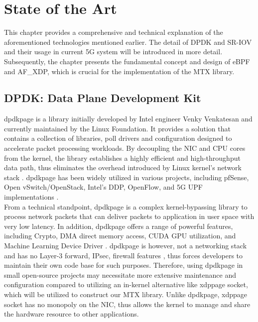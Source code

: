 \cleardoublepage\chapter{State of the Art}\label{sec:sota}\minitoc\vspace{.5cm}
This chapter provides a comprehensive and technical explanation of the aforementioned technologies mentioned earlier. 
The detail of DPDK and SR-IOV and their usage in current 5G system will be introduced in more detail.
Subsequently, the chapter presents the fundamental concept and design of eBPF and AF\_XDP, which is crucial for the implementation of the MTX library.

\section{DPDK: Data Plane Development Kit}
\ac{dpdkpage} is a library initially developed by Intel engineer Venky Venkatesan and currently maintained by the Linux Foundation. 
It provides a solution that contains a collection of libraries, poll drivers and configuration designed to accelerate packet processing workloads. 
By decoupling the NIC and CPU cores from the kernel, the library establishes a highly efficient and high-throughput data path, thus eliminates the overhead introduced by Linux kernel's network stack \cite{kourtis_enhancing_2015}. 
\ac{dpdkpage} has been widely utilized in various projects, including pfSense, Open vSwitch/OpenStack, Intel's DDP, OpenFlow, and 5G UPF implementations \cite{intel_ddp_ethernet_800}\cite{pongracz_removing_2013}\cite{zte_5g_core_upf_impl}\cite{nec_upf_whitepaper}. 
\\

From a technical standpoint, \ac{dpdkpage} is a complex kernel-bypassing library to process network packets that can deliver packets to application in user space with very low latency.
In addition, \ac{dpdkpage} offers a range of powerful features, including Crypto, DMA direct memory access, CUDA GPU utilization, and Machine Learning Device Driver \cite{dpdk_guide_page}. 
\ac{dpdkpage} is however, not a networking stack and has no Layer-3 forward, IPsec, firewall features \cite{old_dpdk_page}, thus forces developers to maintain their own code base for such purposes.
Therefore, using \ac{dpdkpage} in small open-source projects may necessitate more extensive maintenance and configuration compared to utilizing an in-kernel alternative like \ac{xdppage} socket, which will be utilized to construct our MTX library.
Unlike \ac{dpdkpage}, \ac{xdppage} socket has no monopoly on the \ac{NIC}, thus allows the kernel to manage and share the hardware resource to other applications.

